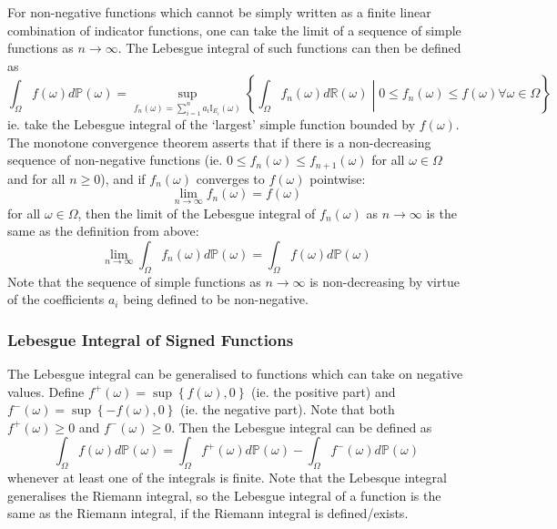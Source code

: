 \documentclass[11pt]{report} %
\begin{document}
For non-negative functions which cannot be simply written as a finite linear combination of indicator functions, one can take the limit of a sequence of simple functions as $n \to \infty$. The Lebesgue integral of such functions can then be defined as
\begin{equation}
\int_{\Omega}f\left(\omega\right)d\mathbb{P}\left(\omega\right) = \sup_{f_{n}\left(\omega\right) = \sum_{i = 1}^{n}a_{i}\mathbb{I}_{E_{i}}\left(\omega\right)}\left\{\int_{\Omega}f_{n}\left(\omega\right)d\mathbb{R}\left(\omega\right)\middle|0\leq f_{n}\left(\omega\right) \leq f\left(\omega\right)\forall \omega \in \Omega\right\}
\end{equation}
ie. take the Lebesgue integral of the `largest' simple function bounded by $f\left(\omega\right)$. The monotone convergence theorem asserts that if there is a non-decreasing sequence of non-negative functions (ie. $0 \leq f_{n}\left(\omega\right) \leq f_{n + 1}\left(\omega\right)$ for all $\omega \in \Omega$ and for all $n \geq 0$), and if $f_{n}\left(\omega\right)$ converges to $f\left(\omega\right)$ pointwise:
\begin{equation}
\lim_{n\to\infty}f_{n}\left(\omega\right) = f\left(\omega\right)
\end{equation}
for all $\omega \in \Omega$, then the limit of the Lebesgue integral of $f_{n}\left(\omega\right)$ as $n \to \infty$ is the same as the definition from above:
\begin{equation}
\lim_{n\to\infty}\int_{\Omega}f_{n}\left(\omega\right)d\mathbb{P}\left(\omega\right) = \int_{\Omega}f\left(\omega\right)d\mathbb{P}\left(\omega\right)
\end{equation}
Note that the sequence of simple functions as $n\to\infty$ is non-decreasing by virtue of the coefficients $a_{i}$ being defined to be non-negative.

\subsubsection{Lebesgue Integral of Signed Functions}

The Lebesgue integral can be generalised to functions which can take on negative values. Define $f^{+}\left(\omega\right) = \sup\left\{f\left(\omega\right), 0\right\}$ (ie. the positive part) and $f^{-}\left(\omega\right) = \sup\left\{-f\left(\omega\right), 0\right\}$ (ie. the negative part). Note that both $f^{+}\left(\omega\right) \geq 0$ and $f^{-}\left(\omega\right) \geq 0$. Then the Lebesgue integral can be defined as
\begin{equation}
\int_{\Omega}f\left(\omega\right)d\mathbb{P}\left(\omega\right) = \int_{\Omega}f^{+}\left(\omega\right)d\mathbb{P}\left(\omega\right) - \int_{\Omega}f^{-}\left(\omega\right)d\mathbb{P}\left(\omega\right)
\end{equation}
whenever at least one of the integrals is finite. Note that the Lebesque integral generalises the Riemann integral, so the Lebesgue integral of a function is the same as the Riemann integral, if the Riemann integral is defined/exists.
\end{document}
